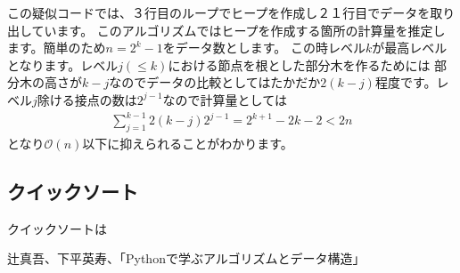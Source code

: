\documentclass[dvipdfmx,pic,eepic,ecltree]{jarticle}
\begin{document}
この疑似コードでは、３行目のループでヒープを作成し２１行目でデータを取り出しています。
このアルゴリズムではヒープを作成する箇所の計算量を推定します。簡単のため$n=2^{k}-1$をデータ数とします。
この時レベル$k$が最高レベルとなります。レベル$j(\leq k)$における節点を根とした部分木を作るためには
部分木の高さが$k-j$なのでデータの比較としてはたかだか$2(k-j)$程度です。レベル$j$除ける接点の数は$2^{j-1}$なので計算量としては
\begin{eqnarray}
\sum_{j=1}^{k-1}2(k-j)2^{j-1}=2^{k+1}-2k-2<2n
\end{eqnarray}
となり$\mathcal{O}(n)$以下に抑えられることがわかります。
\subsection{クイックソート}
クイックソートは
\begin{thebibliography}{9}
\item 辻真吾、下平英寿、「Pythonで学ぶアルゴリズムとデータ構造」
\end{thebibliography}
\end{document}
